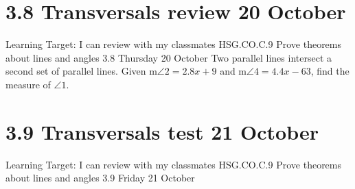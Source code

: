 \section{3.8 Transversals review \hfill 20 October}
\begin{frame}{Learning Target: I can review with my classmates}
  {HSG.CO.C.9 Prove theorems about lines and angles \hfill \alert{3.8 Thursday 20 October}}
  Two parallel lines intersect a second set of parallel lines. Given m$\angle 2 = 2.8x+9$ and m$\angle 4 = 4.4x - 63$, find the measure of $\angle 1$. 
  \begin{flushright}
    \end{flushright}
\end{frame}

\section{3.9 Transversals test \hfill 21 October}
\begin{frame}{Learning Target: I can review with my classmates}
  {HSG.CO.C.9 Prove theorems about lines and angles \hfill \alert{3.9 Friday 21 October}}

\end{frame}


